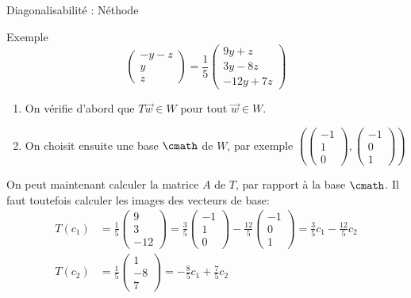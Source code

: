 \begin{parag}{Diagonalisabilité : Néthode}
\begin{subparag}{Exemple}
\[\begin{pmatrix}
            -y -z \\ y \\ z
        \end{pmatrix} = \frac{1}{5}\begin{pmatrix}
            9y + z\\
            3y -8z \\
            -12 y + 7z
        \end{pmatrix}\]
        \begin{enumerate}
            \item On vérifie d'abord que $T\vec{w} \in W$ pour tout $\vec{w} \in W$.
            \item On choisit ensuite une base $\cmath$ de $W$, par exemple
            $\left(\begin{pmatrix}
                -1 \\ 1 \\ 0
            \end{pmatrix}, \begin{pmatrix}
                -1 \\0 \\ 1
            \end{pmatrix}\right)$
        \end{enumerate}
        On peut maintenant calculer la matrice $A$ de $T$, par rapport à la base $\cmath$. Il faut toutefois calculer les images des vecteurs de base:
        \begin{align*}
            T(c_1) &= \frac{1}{5}\begin{pmatrix}
                9 \\ 3 \\ -12
            \end{pmatrix} = \frac{3}{5}\begin{pmatrix}
                -1 \\ 1 \\ 0
            \end{pmatrix} - \frac{12}{5}\begin{pmatrix}
                -1 \\ 0 \\ 1
            \end{pmatrix} = \frac{3}{5}c_1 - \frac{12}{5}c_2\\
            T(c_2) &= \frac{1}{5}\begin{pmatrix}
                1 \\ -8 \\ 7
            \end{pmatrix} = -\frac{8}{5}c_1 + \frac{7}{5}c_2

\end{align*}
\end{subparag}
\end{parag}
